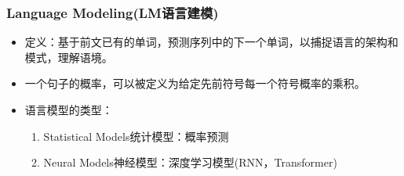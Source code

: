 \documentclass[UTF8]{ctexart}
\begin{document}
\subsubsection{Language Modeling(LM语言建模)}

\begin{itemize}
    \item 定义：基于前文已有的单词，预测序列中的下一个单词，以捕捉语言的架构和模式，理解语境。
    \item 一个句子的概率，可以被定义为给定先前符号每一个符号概率的乘积。
    \item 语言模型的类型：
    \begin{enumerate}
        \item Statistical Models统计模型：概率预测
        \item Neural Models神经模型：深度学习模型(RNN，Transformer)
    \end{enumerate}
\end{itemize}
\end{document}
